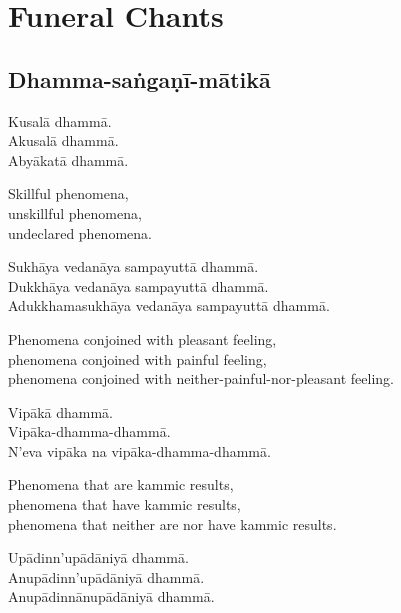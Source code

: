 \chapter{Funeral Chants}

\section{Dhamma-saṅgaṇī-mātikā}




Kusalā dhammā.\\
Akusalā dhammā.\\
Abyākatā dhammā.

\begin{english}
  Skillful phenomena,\\
  unskillful phenomena,\\
  undeclared phenomena.
\end{english}

Sukhāya vedanāya sampayuttā dhammā.\\
Dukkhāya vedanāya sampayuttā dhammā.\\
Adukkhamasukhāya vedanāya sampayuttā dhammā.

\begin{english}
  Phenomena conjoined with pleasant feeling,\\
  phenomena conjoined with painful feeling,\\
  phenomena conjoined with neither-painful-nor-pleasant feeling.
\end{english}

Vipākā dhammā.\\
Vipāka-dhamma-dhammā.\\
N'eva vipāka na vipāka-dhamma-dhammā.

\begin{english}
  Phenomena that are kammic results,\\
  phenomena that have kammic results,\\
  phenomena that neither are nor have kammic results.
\end{english}

\clearpage

Upādinn'upādāniyā dhammā.\\
Anupādinn'upādāniyā dhammā.\\
Anupādinnānupādāniyā dhammā.

